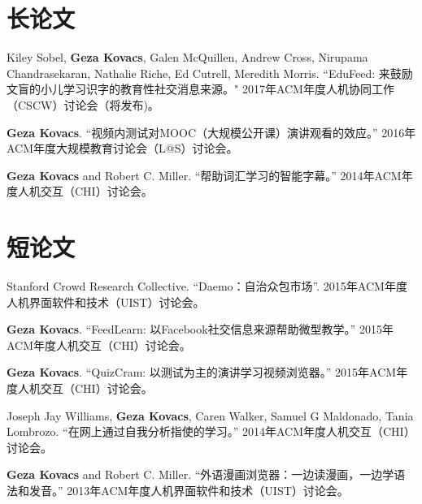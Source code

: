 \documentclass[margin,line]{resume}
\begin{document}
\begin{resume}



\section{\mysidestyle 长论文}


Kiley Sobel, \textbf{Geza Kovacs}, Galen McQuillen, Andrew Cross, Nirupama Chandrasekaran, Nathalie Riche, Ed Cutrell, Meredith Morris. ``EduFeed: 来鼓励文盲的小儿学习识字的教育性社交消息来源。" 2017年ACM年度人机协同工作（CSCW）讨论会（将发布)。

\textbf{Geza Kovacs}. ``视频内测试对MOOC（大规模公开课）演讲观看的效应。'' 2016年ACM年度大规模教育讨论会（L@S）讨论会。

\textbf{Geza Kovacs} and Robert C. Miller. ``帮助词汇学习的智能字幕。'' 2014年ACM年度人机交互（CHI）讨论会。


\section{\mysidestyle 短论文}

Stanford Crowd Research Collective. ``Daemo：自治众包市场''. 2015年ACM年度人机界面软件和技术（UIST）讨论会。

\textbf{Geza Kovacs}. ``FeedLearn: 以Facebook社交信息来源帮助微型教学。'' 2015年ACM年度人机交互（CHI）讨论会。

\textbf{Geza Kovacs}. ``QuizCram: 以测试为主的演讲学习视频浏览器。'' 2015年ACM年度人机交互（CHI）讨论会。

Joseph Jay Williams, \textbf{Geza Kovacs}, Caren Walker, Samuel G Maldonado, Tania Lombrozo. ``在网上通过自我分析指使的学习。'' 2014年ACM年度人机交互（CHI）讨论会。

\textbf{Geza Kovacs} and Robert C. Miller. ``外语漫画浏览器：一边读漫画，一边学语法和发音。''  2013年ACM年度人机界面软件和技术（UIST）讨论会。


\end{resume}
\end{document}
